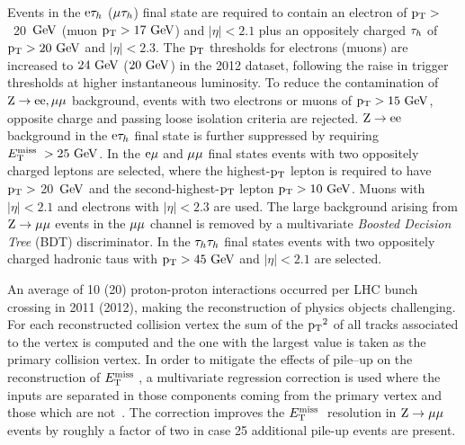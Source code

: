 Events in the $\mathrm{e}\mathrm{\tau}_h$ ($\mathrm{\mu}\mathrm{\tau}_h$) final state are required to contain
an electron of $\mathrm{p_{T}} >$~20~$\mathrm{GeV}$ (muon $\mathrm{p_{T}} >17~\mathrm{GeV}$) and $|\eta| < 2.1$ plus an oppositely charged $\mathrm{\tau}_h$ of $\mathrm{p_{T}} > 20~\mathrm{GeV}$ and $|\eta| < 2.3$.
The $\mathrm{p_{T}}$ thresholds for electrons (muons) are increased to $24~\mathrm{GeV}$ ($20~\mathrm{GeV}$) in the 2012 dataset,
following the raise in trigger thresholds at higher instantaneous luminosity.
To reduce the contamination of $\mathrm{Z}\to\mathrm{e}\mathrm{e}, \mathrm{\mu}\mathrm{\mu}$ background, events with two electrons or muons of $\mathrm{p_{T}} >15~\mathrm{GeV}$, opposite charge and passing loose isolation criteria are rejected.
$\mathrm{Z}\to\mathrm{e}\mathrm{e}$ background in the $\mathrm{e}\mathrm{\tau}_h$ final state is further suppressed by requiring $E_\mathrm{T}^{\mathrm{miss}}\; > 25~\mathrm{GeV}$.
In the $\mathrm{e}\mathrm{\mu}$ and $\mathrm{\mu}\mathrm{\mu}$ final states events with two oppositely charged leptons are selected, where the highest-$\mathrm{p_{T}}$ lepton is required to have $\mathrm{p_{T}} >$ 20~$\mathrm{GeV}$ and the second-highest-$\mathrm{p_{T}}$ lepton $\mathrm{p_{T}} >10~\mathrm{GeV}$. Muons with $|\eta|<2.1$ and electrons
 with  $|\eta|<2.3$ are used. 
The large background arising from $\mathrm{Z}\to \mathrm{\mu}\mathrm{\mu}$ events in the $\mathrm{\mu}\mathrm{\mu}$ channel
is removed by a multivariate {\it Boosted Decision Tree} (BDT) discriminator.
In the $\mathrm{\tau}_h\mathrm{\tau}_h$ final states events with two oppositely charged hadronic taus with $\mathrm{p_{T}} > 45~\mathrm{GeV}$ and $|\eta| < 2.1$ are selected.

An average of 10 (20) proton-proton interactions occurred per LHC bunch crossing in 2011 (2012), making the reconstruction of physics objects challenging. For each reconstructed collision vertex the sum of the $\mathrm{p_{T}}^2$ of all tracks associated to the vertex is computed and the one with the largest value is taken as the primary collision vertex. In order to mitigate the effects of pile--up on the reconstruction of $E_\mathrm{T}^{\mathrm{miss}}\;$, a multivariate regression correction is used where the inputs are separated in those components coming from the primary vertex and those which are not~\cite{CMS-PAS-JME-12-002}. 
The correction improves the $E_\mathrm{T}^{\mathrm{miss}}\;$ resolution in $\mathrm{Z}\rightarrow\mathrm{\mu}\mathrm{\mu}$ events by roughly a factor of two in case 25 additional pile-up events are present. 

